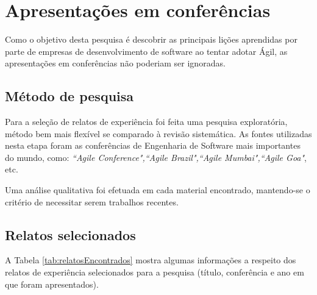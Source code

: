 %
%

\section{Apresentações em conferências}

Como o objetivo desta pesquisa é descobrir as principais lições aprendidas por parte de empresas de desenvolvimento de software ao tentar adotar Ágil, as apresentações em conferências não poderiam ser ignoradas.

\subsection{Método de pesquisa}

Para a seleção de relatos de experiência foi feita uma pesquisa exploratória, método bem mais flexível se comparado à revisão sistemática. As fontes utilizadas nesta etapa foram as conferências de Engenharia de Software mais importantes do mundo, como: \textit{``Agile Conference",``Agile Brazil",``Agile Mumbai",``Agile Goa"}, etc.

Uma análise qualitativa foi efetuada em cada material encontrado, mantendo-se o critério de necessitar serem trabalhos recentes.

\subsection{Relatos selecionados}

A Tabela \ref{tab:relatosEncontrados} mostra algumas informações a respeito dos relatos de experiência selecionados para a pesquisa (título, conferência e ano em que foram apresentados).

